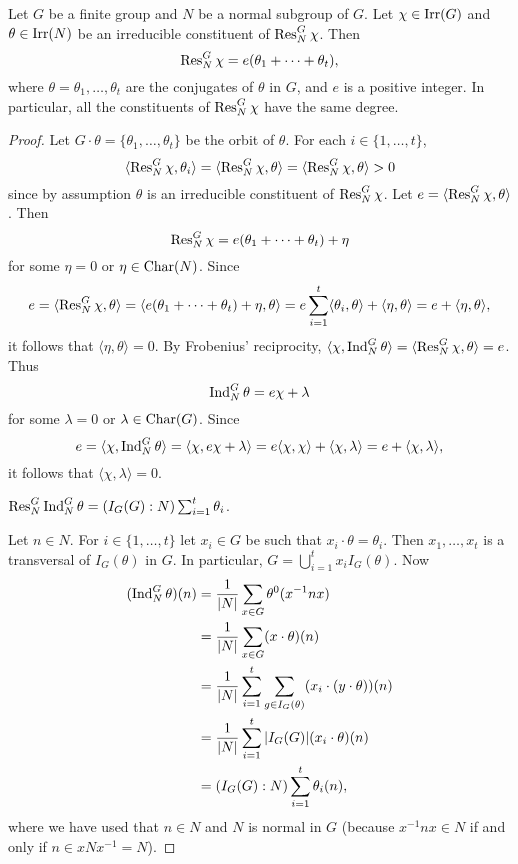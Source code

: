 \begin{theorem}[Clifford]
\label{thm:Clifford}
    Let $G$ be a finite group and $N$ be a normal
    subgroup of $G$. Let $\chi\in\operatorname{Irr}(G)$ and $\theta\in\operatorname{Irr}(N)$ be 
    an irreducible constituent of $\operatorname{Res}_N^G\chi$. 
    Then 
    \[
    \operatorname{Res}_N^G\chi = e(\theta_1+\cdots+\theta_t),
    \]
    where $\theta=\theta_1,\dots,\theta_t$ are the conjugates 
    of $\theta$ in $G$, 
    and $e$ is a positive integer. In particular, all the constituents of $\operatorname{Res}_N^G\chi$ have the same degree. 
\end{theorem}

\begin{proof}
    Let $G\cdot\theta=\{\theta_1,\dots,\theta_t\}$ be the 
    orbit of $\theta$. For each $i\in\{1,\dots,t\}$, 
    \[
    \langle\operatorname{Res}_N^G\chi,\theta_i\rangle 
    =\langle \operatorname{Res}_N^G\chi,\theta\rangle
    =\langle\operatorname{Res}_N^G\chi,\theta\rangle>0
    \]
    since by assumption $\theta$ is an irreducible constituent of $\operatorname{Res}_N^G\chi$. 
    Let $e=\langle\operatorname{Res}_N^G\chi,\theta\rangle$. Then 
    \[
    \operatorname{Res}_N^G\chi=e(\theta_1+\cdots+\theta_t)+\eta
    \]
    for some $\eta=0$ or $\eta\in\operatorname{Char}(N)$. Since 
    \[
    e=\langle\operatorname{Res}_N^G\chi,\theta\rangle
    =\langle e(\theta_1+\cdots+\theta_t)+\eta,\theta\rangle
    =e\sum_{i=1}^t\langle\theta_i,\theta\rangle+\langle\eta,\theta\rangle
    =e+\langle\eta,\theta\rangle,
    \]
    it follows that $\langle\eta,\theta\rangle=0$. By Frobenius' reciprocity, 
    $\langle\chi,\operatorname{Ind}_N^G\theta\rangle
    =\langle\operatorname{Res}_N^G\chi,\theta\rangle=e$.
    Thus 
    \[
    \operatorname{Ind}_N^G\theta=e\chi+\lambda 
    \]
    for some $\lambda=0$ or $\lambda\in\operatorname{Char}(G)$. Since 
    \[
    e=\langle\chi,\operatorname{Ind}_N^G\theta\rangle 
    =\langle\chi, e\chi+\lambda\rangle
    =e\langle\chi,\chi\rangle+\langle\chi,\lambda\rangle 
    =e+\langle\chi,\lambda\rangle,
    \]
    it follows that $\langle\chi,\lambda\rangle=0$.

    \begin{claim}
        $\operatorname{Res}_N^G\operatorname{Ind}_N^G\theta=(I_G(G):N)\sum_{i=1}^t\theta_i$.
    \end{claim}

    Let $n\in N$. For $i\in\{1,\dots,t\}$ let 
    $x_i\in G$ be such that $x_i\cdot\theta=\theta_i$. Then 
    $x_1,\dots,x_t$ is a transversal of $I_G(\theta)$ in $G$. In particular, 
    $G=\bigcup_{i=1}^tx_iI_G(\theta)$. 
    Now  
    \begin{align*}
        (\operatorname{Ind}_N^G\theta)(n) &= \frac{1}{|N|}\sum_{x\in G}\theta^0(x^{-1}nx)\\
        &=\frac{1}{|N|}\sum_{x\in G}(x\cdot\theta)(n)\\
        &=\frac{1}{|N|}\sum_{i=1}^t\sum_{g\in I_G(\theta)}(x_i\cdot (y\cdot\theta))(n)\\
        &=\frac{1}{|N|}\sum_{i=1}^t|I_G(G)|(x_i\cdot \theta)(n)\\
        &=(I_G(G):N)\sum_{i=1}^t\theta_i(n), 
    \end{align*}
    where we have used that $n\in N$ and $N$ is normal in $G$ (because $x^{-1}nx\in N$ if and only if
    $n\in xNx^{-1}=N$). 


\end{proof}
